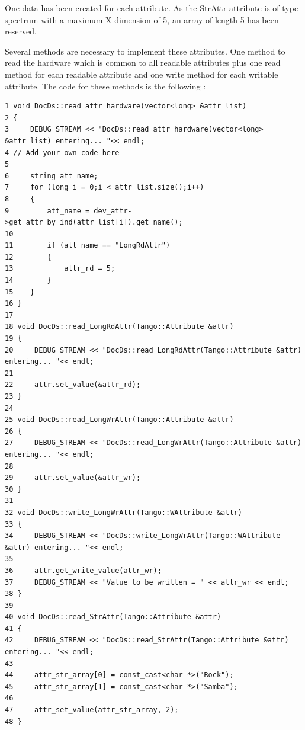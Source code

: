One data has been created for each attribute. As the StrAttr attribute
is of type spectrum with a maximum X dimension of 5, an array of length
5 has been reserved.

Several methods are necessary to implement these attributes. One method
to read the hardware which is common to all \textquotedbl{}readable\textquotedbl{}
attributes plus one \textquotedbl{}read\textquotedbl{} method for
each readable attribute and one \textquotedbl{}write\textquotedbl{}
method for each writable attribute. The code for these methods is
the following :


\begin{verbatim}
1 void DocDs::read_attr_hardware(vector<long> &attr_list)
2 {
3     DEBUG_STREAM << "DocDs::read_attr_hardware(vector<long> &attr_list) entering... "<< endl;
4 // Add your own code here
5 
6     string att_name;
7     for (long i = 0;i < attr_list.size();i++)
8     {
9         att_name = dev_attr->get_attr_by_ind(attr_list[i]).get_name();
10 
11        if (att_name == "LongRdAttr")
12        {
13            attr_rd = 5;
14        }
15    }
16 }
17 
18 void DocDs::read_LongRdAttr(Tango::Attribute &attr)
19 {
20     DEBUG_STREAM << "DocDs::read_LongRdAttr(Tango::Attribute &attr) entering... "<< endl;
21 
22     attr.set_value(&attr_rd);
23 }
24 
25 void DocDs::read_LongWrAttr(Tango::Attribute &attr)
26 {
27     DEBUG_STREAM << "DocDs::read_LongWrAttr(Tango::Attribute &attr) entering... "<< endl;
28 
29     attr.set_value(&attr_wr);
30 }
31 
32 void DocDs::write_LongWrAttr(Tango::WAttribute &attr)
33 {
34     DEBUG_STREAM << "DocDs::write_LongWrAttr(Tango::WAttribute &attr) entering... "<< endl;
35 
36     attr.get_write_value(attr_wr);
37     DEBUG_STREAM << "Value to be written = " << attr_wr << endl;
38 }
39 
40 void DocDs::read_StrAttr(Tango::Attribute &attr)
41 {
42     DEBUG_STREAM << "DocDs::read_StrAttr(Tango::Attribute &attr) entering... "<< endl;
43 
44     attr_str_array[0] = const_cast<char *>("Rock");
45     attr_str_array[1] = const_cast<char *>("Samba");
46 
47     attr_set_value(attr_str_array, 2);
48 }
\end{verbatim}



